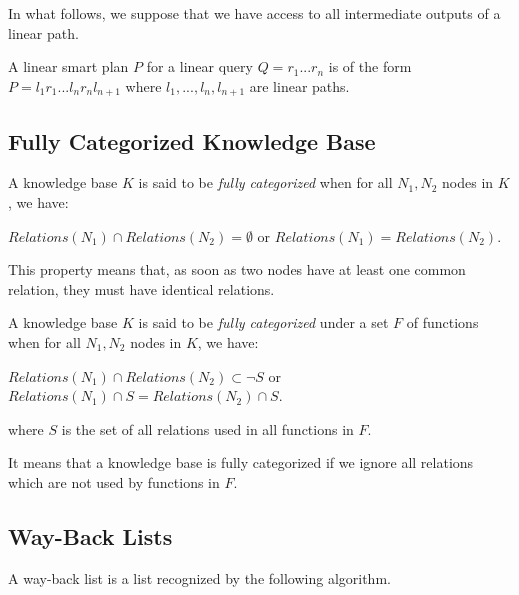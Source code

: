 \documentclass[10pt,a4paper,draft]{article}
\begin{document}
In what follows, we suppose that we have access to all intermediate outputs of a linear path.

\begin{Property}
A linear smart plan $P$ for a linear query $Q = r_1 ... r_n$ is of the form $P = l_1 r_1 ... l_n r_n l_{n+1}$ where $l_1,..., l_n, l_{n+1}$ are linear paths.
\end{Property}

\subsection{Fully Categorized Knowledge Base}

\begin{Definition}
A knowledge base $K$ is said to be \textit{fully categorized} when for all $N_1, N_2$ nodes in $K$, we have:\\
\begin{center}
$Relations(N_1) \cap Relations(N_2) = \emptyset$ or $Relations(N_1) = Relations(N_2)$.
\end{center}
\end{Definition}

This property means that, as soon as two nodes have at least one common relation, they must have identical relations.

\begin{Definition}
A knowledge base $K$ is said to be \textit{fully categorized} under a set $F$ of functions when for all $N_1, N_2$ nodes in $K$, we have:\\
\begin{center}
$Relations(N_1) \cap Relations(N_2) \subset \neg S$ or $Relations(N_1) \cap S = Relations(N_2) \cap S$.
\end{center}
where $S$ is the set of all relations used in all functions in $F$.
\end{Definition}

It means that a knowledge base is fully categorized if we ignore all relations which are not used by functions in $F$.

\subsection{Way-Back Lists}

\begin{Definition}
\label{Way-Back List 1}
A way-back list is a list recognized by the following algorithm.
\end{Definition}
\end{document}
